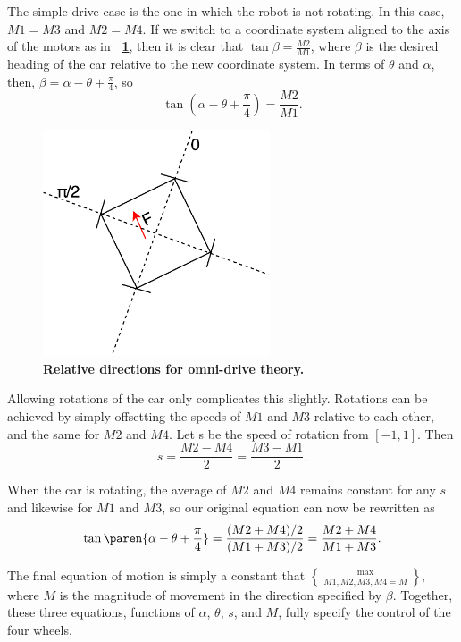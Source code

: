 \documentclass[letterpaper, 11pt]{article}
\newcommand*{\figref}[1]{\textbf{\figurename~\ref{#1}}}
\begin{document}
The simple drive case is the one in which the robot is not rotating. In this case, $M1=M3$ and $M2=M4$. If we switch to a coordinate system aligned to the axis of the motors as in \figref{fig:omni2}, then it is clear that $\tan{\beta} = \frac{M2}{M1}$, where $\beta$ is the desired heading of the car relative to the new coordinate system. In terms of $\theta$ and $\alpha$, then, $\beta = \alpha - \theta + \frac{\pi}{4}$, so \[\tan{(\alpha - \theta + \frac{\pi}{4})} = \frac{M2}{M1}.\]

\begin{figure}[ht]
    \centering
    \includegraphics[width=0.6\textwidth]{images/omni2.pdf}
    \caption{\textbf{Relative directions for omni-drive theory.}}
    \label{fig:omni2}
\end{figure}

Allowing rotations of the car only complicates this slightly. Rotations can be achieved by simply offsetting the speeds of $M1$ and $M3$ relative to each other, and the same for $M2$ and $M4$. Let s be the speed of rotation from $[-1, 1]$. Then \[s = \frac{M2-M4}{2} = \frac{M3-M1}{2}.\]

When the car is rotating, the average of $M2$ and $M4$ remains constant for any $s$ and likewise for $M1$ and $M3$, so our original equation can now be rewritten as \[\tan\paren{\alpha - \theta + \frac{\pi}{4}} = \frac{(M2+M4)/2}{(M1+M3)/2} = \frac{M2+M4}{M1+M3}.\]

The final equation of motion is simply a constant that $\max\brace{M1, M2, M3, M4} = M$, where $M$ is the magnitude of movement in the direction specified by $\beta$. Together, these three equations, functions of $\alpha$, $\theta$, $s$, and $M$, fully specify the control of the four wheels.
\end{document}
